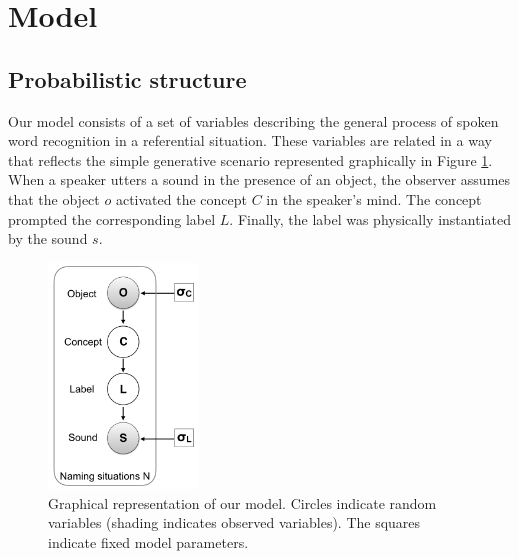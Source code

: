 \documentclass[english,,man]{apa6}
\begin{document}
\hypertarget{model}{%
\section{Model}\label{model}}

\hypertarget{probabilistic-structure}{%
\subsection{Probabilistic structure}\label{probabilistic-structure}}

Our model consists of a set of variables describing the general process of spoken word recognition in a referential situation. These variables are related in a way that reflects the simple generative scenario represented graphically in Figure \ref{fig:model}. When a speaker utters a sound in the presence of an object, the observer assumes that the object \(o\) activated the concept \(C\) in the speaker's mind. The concept prompted the corresponding label \(L\). Finally, the label was physically instantiated by the sound \(s\).

\begin{figure}

{\centering \includegraphics[width=150px]{figs/model} 

}

\caption{Graphical representation of our model. Circles indicate random variables (shading indicates observed variables). The squares indicate fixed model parameters.}\label{fig:model}
\end{figure}
\end{document}
